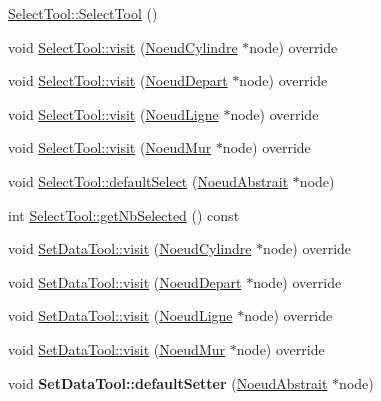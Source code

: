 \begin{DoxyCompactItemize}
\item 
\hyperlink{group__inf2990_ga2174af55e744036f0ccc5ce1fe25ddb1}{Select\+Tool\+::\+Select\+Tool} ()
\item 
void \hyperlink{group__inf2990_gacd9fee116b738725ab0f664029253fa0}{Select\+Tool\+::visit} (\hyperlink{class_noeud_cylindre}{Noeud\+Cylindre} $\ast$node) override
\item 
void \hyperlink{group__inf2990_ga392f7eb2a74106cff675878f5453a9d3}{Select\+Tool\+::visit} (\hyperlink{class_noeud_depart}{Noeud\+Depart} $\ast$node) override
\item 
void \hyperlink{group__inf2990_ga842d1455b15f04fc9e97fc5716f0d5be}{Select\+Tool\+::visit} (\hyperlink{class_noeud_ligne}{Noeud\+Ligne} $\ast$node) override
\item 
void \hyperlink{group__inf2990_gab6a7d46d8fad7c1045678b6dec3c9400}{Select\+Tool\+::visit} (\hyperlink{class_noeud_mur}{Noeud\+Mur} $\ast$node) override
\item 
void \hyperlink{group__inf2990_ga01b8ec1322baa74ee48e5087337bc959}{Select\+Tool\+::default\+Select} (\hyperlink{class_noeud_abstrait}{Noeud\+Abstrait} $\ast$node)
\item 
int \hyperlink{group__inf2990_gaca4f60cc972b5d9df612f48c18c8364a}{Select\+Tool\+::get\+Nb\+Selected} () const 
\item 
void \hyperlink{group__inf2990_gaab929a1ed9e3f6a2e80a15aef5de8f71}{Set\+Data\+Tool\+::visit} (\hyperlink{class_noeud_cylindre}{Noeud\+Cylindre} $\ast$node) override
\item 
void \hyperlink{group__inf2990_gabe996cec1a80bdb4a10383bf4716532d}{Set\+Data\+Tool\+::visit} (\hyperlink{class_noeud_depart}{Noeud\+Depart} $\ast$node) override
\item 
void \hyperlink{group__inf2990_ga1c46b84b64c6ff0ca516e5419a33911c}{Set\+Data\+Tool\+::visit} (\hyperlink{class_noeud_ligne}{Noeud\+Ligne} $\ast$node) override
\item 
void \hyperlink{group__inf2990_ga5833b6797fd9a603bedd502431fc76cc}{Set\+Data\+Tool\+::visit} (\hyperlink{class_noeud_mur}{Noeud\+Mur} $\ast$node) override
\item 
\hypertarget{group__inf2990_ga410f169c9f53a3a018bce606e0ba9f23}{}void {\bfseries Set\+Data\+Tool\+::default\+Setter} (\hyperlink{class_noeud_abstrait}{Noeud\+Abstrait} $\ast$node)\label{group__inf2990_ga410f169c9f53a3a018bce606e0ba9f23}


\end{DoxyCompactItemize}
